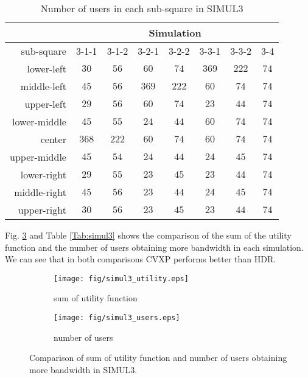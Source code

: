 	\begin{table} \small
		\centering \caption{Number of users in each sub-square in SIMUL3}
		\renewcommand\arraystretch{1.0}
		\begin{tabular}{|r||c||c||c||c||c||c||c|} %
			\hline
			&\multicolumn{7}{|c|}{Simulation} \\
			\hline	sub-square & 3-1-1 & 3-1-2 & 3-2-1 & 3-2-2 & 3-3-1 & 3-3-2 & 3-4 \\
			\hline
			\hline	lower-left & $30$ & $56$ & $60$ & $74$ & $369$ & $222$ & $74$ \\
			\hline	middle-left & $45$ & $56$ & $369$ & $222$ & $60$ & $74$ & $74$ \\
			\hline	upper-left & $29$ & $56$ & $60$ & $74$ & $23$ & $44$ & $74$ \\
			\hline	lower-middle & $45$ & $55$ & $24$ & $44$ & $60$ & $74$ & $74$ \\
			\hline	center & $368$ & $222$ & $60$ & $74$ & $60$ & $74$ & $74$ \\
			\hline	upper-middle & $45$ & $54$ & $24$ & $44$ & $24$ & $45$ & $74$ \\
			\hline	lower-right & $29$ & $55$ & $23$ & $45$ & $23$ & $44$ & $74$ \\
			\hline	middle-right & $45$ & $56$ & $23$ & $44$ & $24$ & $45$ & $74$ \\
			\hline	upper-right & $30$ & $56$ & $23$ & $45$ & $23$ & $44$ & $74$ \\
			\hline
		\end{tabular}\label{Tab:nouies3}
	\end{table}
	
	Fig. \ref{figure:simul3} and Table \ref{Tab:simul3} shows the comparison of the sum of the utility function and the number of users obtaining more bandwidth in each simulation. We can see that in both comparisons CVXP performs better than HDR.
	
	\begin{figure}
		\begin{center}
			\begin{subfigure}[b]{0.4\textwidth}
				\texttt{[image: fig/simul3\_utility.eps]}
				\caption{sum of utility function}
				\label{figure:simul3_a}
			\end{subfigure}
			\begin{subfigure}[b]{0.4\textwidth}
				\texttt{[image: fig/simul3\_users.eps]}
				\caption{number of users}
				\label{figure:simul3_b}
			\end{subfigure}
			\caption{Comparison of sum of utility function and number of users obtaining more bandwidth in SIMUL3.}
			\label{figure:simul3}
		\end{center}
	\end{figure}
	

